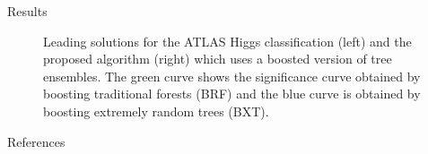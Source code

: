 \documentclass[final]{beamer}
\begin{document}
\begin{frame}{}
\begin{textblock}{20}
\begin{block}{Results}
\begin{figure}
\begin{minipage}{0.95\textwidth}
\caption{\tiny{Leading solutions for the ATLAS Higgs classification (left) and the proposed algorithm (right) which uses a boosted version of tree ensembles. The green curve shows the significance curve obtained by boosting traditional forests (BRF) and the blue curve is obtained by boosting extremely random trees (BXT).}} %
\end{minipage}
\end{figure}
\end{block}
\vspace{-6mm}

\begin{block}{References}
\begin{minipage}{0.9\linewidth}
     {
     \printbibliography
     } 
\end{minipage}
\end{block}

\end{textblock}

\end{frame}
\end{document}

